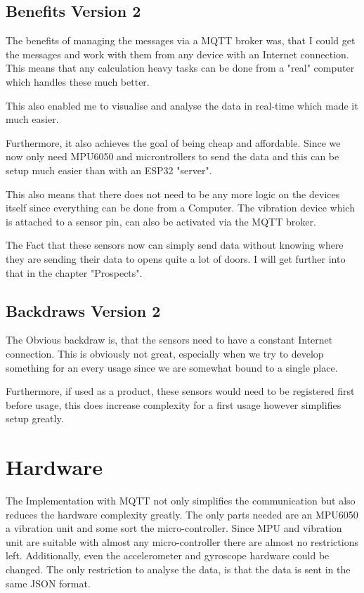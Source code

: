 \subsection{Benefits Version 2}

The benefits of managing the messages via a MQTT broker was, that I could get the messages and work with them from any device with an Internet connection. This means that any calculation heavy tasks can be done from a "real" computer which handles these much better. 

This also enabled me to visualise and analyse the data in real-time which made it much easier. 

Furthermore, it also achieves the goal of being cheap and affordable. Since we now only need MPU6050 and microntrollers to send the data and this can be setup much easier than with an ESP32 "server".

This also means that there does not need to be any more logic on the devices itself since everything can be done from a Computer. The vibration device which is attached to a sensor pin, can also be activated via the MQTT broker. 

The Fact that these sensors now can simply send data without knowing where they are sending their data to opens quite a lot of doors. I will get further into that in the chapter "Prospects".

\subsection{Backdraws Version 2}

The Obvious backdraw is, that the sensors need to have a constant Internet connection. This is obviously not great, especially when we try to develop something for an every usage since we are somewhat bound to a single place. 

Furthermore, if used as a product, these sensors would need to be registered first before usage, this does increase complexity for a first usage however simplifies setup greatly.






\newpage

\section{Hardware}

The Implementation with MQTT not only simplifies the communication but also reduces the hardware complexity greatly. The only parts needed are an MPU6050 a vibration unit and some sort the micro-controller. Since MPU and vibration unit are suitable with almost any micro-controller there are almost no restrictions left. Additionally, even the accelerometer and gyroscope hardware could be changed. The only restriction to analyse the data, is that the data is sent in the same JSON format. 

